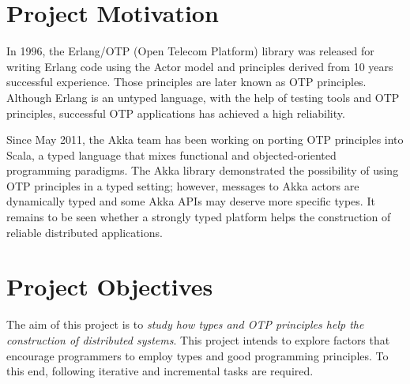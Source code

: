 \section{Project Motivation}
In 1996, the Erlang/OTP (Open Telecom Platform) library\cite{ErlangWeb} was released for writing Erlang code using the Actor model\cite{Hewitt:1973} and principles derived from 10 years successful experience.  Those principles are later known as OTP principles.  Although Erlang is an untyped language, with the help of testing tools and OTP principles, successful OTP applications has achieved a high reliability.\cite{ArmstrongErlang}

Since May 2011, the Akka team has been working on porting OTP principles into Scala, a typed language that mixes functional and objected-oriented programming paradigms. The Akka library\cite{akka_doc, akka_api} demonstrated the possibility of using OTP principles in a typed setting; however, messages to Akka actors are dynamically typed and some Akka APIs may deserve more specific types.  It remains to be seen whether a strongly typed platform helps the construction of reliable distributed applications.

\section{Project Objectives}
The aim of this project is to {\it{study how types and OTP principles help the construction of distributed systems}}.  This project intends to explore factors that encourage programmers to employ types and good programming principles.   To this end, following iterative and incremental tasks are required.

